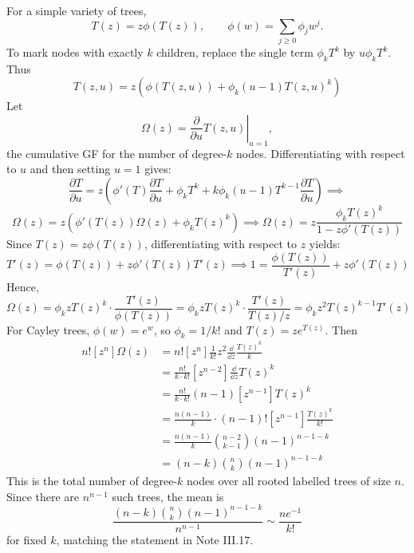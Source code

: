 For a simple variety of trees,
\begin{equation*}
    T(z) = z\phi(T(z)), \qquad \phi(w)=\sum_{j\geq 0}\phi_j w^j.
\end{equation*}
To mark nodes with exactly $k$ children, replace the single term $\phi_kT^k$ by
$u\phi_kT^k$. Thus
\begin{equation*}
    T(z, u) = z\left(\phi(T(z, u)) + \phi_{k}(u - 1)T(z, u)^{k}\right)
\end{equation*}
Let
\begin{equation*}
    \Omega(z) = \left.\frac{\partial}{\partial u}T(z,u)\right|_{u=1},
\end{equation*}
the cumulative GF for the number of degree-$k$ nodes. Differentiating with respect to $u$
and then setting $u=1$ gives:
\begin{equation*}
    \frac{\partial T}{\partial u} =
        z\left(\phi'(T)\frac{\partial T}{\partial u} + \phi_{k}T^{k} + k\phi_{k}(u - 1)T^{k - 1} \frac{\partial T}{\partial u} \right) \implies
\end{equation*}
\begin{equation*}
    \Omega(z) = z\left(\phi'(T(z))\Omega(z) + \phi_{k}T(z)^{k}\right) \implies
        \Omega(z) = z \frac{\phi_{k}T(z)^{k}}{1 - z\phi'(T(z))}
\end{equation*}
Since $T(z) = z\phi(T(z))$, differentiating with respect to $z$ yields:
\begin{equation*}
    T'(z) = \phi(T(z)) + z\phi'(T(z))T'(z) \implies 1 = \frac{\phi(T(z))}{T'(z)} + z\phi'(T(z))
\end{equation*}
Hence,
\begin{equation*}
    \Omega(z) = \phi_{k}zT(z)^{k} \cdot \frac{T'(z)}{\phi(T(z))} = \phi_{k}zT(z)^{k} \cdot \frac{T'(z)}{T(z)/z} = \phi_{k}z^{2}T(z)^{k - 1}T'(z)
\end{equation*}
For Cayley trees, $\phi(w)=e^w$, so $\phi_k=1/k!$ and $T(z)=ze^{T(z)}$. Then
\begin{equation*}
    \begin{aligned}
        n![z^{n}] \Omega(z)
        &= n![z^{n}] \frac{1}{k!} z^{2} \frac{\dd}{\dd z} \frac{T(z)^{k}}{k} \\
        &= \frac{n!}{k \cdot k!} [z^{n - 2}] \frac{\dd}{\dd z} T(z)^{k} \\
        &= \frac{n!}{k \cdot k!}(n - 1)[z^{n - 1}] T(z)^{k} \\
        &= \frac{n(n - 1)}{k} \cdot (n - 1)![z^{n - 1}] \frac{T(z)^{k}}{k!} \\
        &= \frac{n(n - 1)}{k} \binom{n - 2}{k - 1}(n - 1)^{n - 1 - k} \\
        &= (n - k)\binom{n}{k}(n - 1)^{n - 1 - k}
    \end{aligned}
\end{equation*}
This is the total number of degree-$k$ nodes over all rooted labelled trees of size $n$.
Since there are $n^{n-1}$ such trees, the mean is
\begin{equation*}
    \frac{(n - k)\binom{n}{k}(n - 1)^{n - 1 - k}}{n^{n-1}}
        \sim \frac{ne^{-1}}{k!}
\end{equation*}
for fixed $k$, matching the statement in Note III.17.

